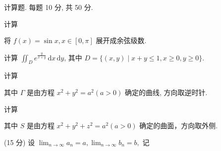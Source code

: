 \par{}
计算题. 每题 10 分, 共 50 分.\par
\par{}
计算\par
\nopagebreak[4]
将 $f(x) = \sin x, x \in [0, \pi]$ 展开成余弦级数.\par
计算 $\iint_{D} e^{\frac{y}{x + y}} \, \mathrm{d}x \, \mathrm{d}y$, 其中 $D = \{(x, y) \mid x + y \leq 1, x \geq 0, y \geq 0\}$.\par
\par{}
计算\par
\nopagebreak[4]
其中  $\Gamma$  是由方程  $x^{2} + y^{2} = a^{2} (a > 0)$  确定的曲线, 方向取逆时针.\par
\par{}
计算\par
\nopagebreak[4]
其中 $S$ 是由方程 $x^{2} + y^{2} + z^{2} = a^{2}(a > 0)$ 确定的曲面，方向取外侧.\par
\par{}
\par{}
(15 分) 设 $\lim_{n\to \infty}a_n = a,\lim_{n\to \infty}b_n = b,$ 记\par
